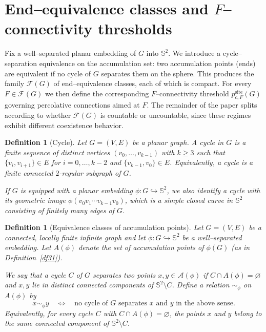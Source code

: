 \documentclass[11pt]{amsart}
\theoremstyle{plain}
\newtheorem{definition}[theorem]{Definition}
\numberwithin{equation}{section}
\numberwithin{figure}{section}
\begin{document}
\section{End--equivalence classes and $F$--connectivity thresholds}
\label{sec3}

Fix a well--separated planar embedding of $G$ into $\mathbb S^2$.
We introduce a cycle--separation equivalence on the accumulation set: two accumulation points (ends)
are equivalent if no cycle of $G$ separates them on the sphere.
This produces the family $\mathcal F(G)$ of end--equivalence classes, each of which is compact.
For every $F\in\mathcal F(G)$ we then define the corresponding $F$--connectivity threshold
$p^{\mathrm{site}}_{c,F}(G)$ governing percolative connections aimed at $F$.
The remainder of the paper splits according to whether $\mathcal F(G)$ is countable or uncountable,
since these regimes exhibit different coexistence behavior.

\begin{definition}[Cycle]
Let $G=(V,E)$ be a planar graph. A \emph{cycle} in $G$ is a finite sequence of distinct
vertices $(v_0,\ldots,v_{k-1})$ with $k\ge 3$ such that
$\{v_i,v_{i+1}\}\in E$ for $i=0,\ldots,k-2$ and $\{v_{k-1},v_0\}\in E$.
Equivalently, a cycle is a finite connected $2$-regular subgraph of $G$.

If $G$ is equipped with a planar embedding $\phi\colon G\hookrightarrow \mathbb S^2$,
we also identify a cycle with its geometric image
$\phi(v_0v_1\cdots v_{k-1}v_0)$, which is a simple closed curve in $\mathbb S^2$
consisting of finitely many edges of $G$.
\end{definition}



\begin{definition}[Equivalence classes of accumulation points]\label{df52}
Let $G=(V,E)$ be a connected, locally finite infinite graph and let
$\phi:G\hookrightarrow\mathbb S^2$ be a well--separated embedding.  
Let $A(\phi)$ denote the set of accumulation points of $\phi(G)$
(as in Definition~\ref{df31}).

We say that a cycle $C$ of $G$ \emph{separates} two points
$x,y\in \mathcal{A}(\phi)$ if $C\cap A(\phi)=\varnothing$ and $x,y$ lie in distinct
connected components of $\mathbb S^2\!\setminus C$.
Define a relation $\sim_\phi$ on $A(\phi)$ by
\[
x\sim_\phi y
\quad\Longleftrightarrow\quad
\text{no cycle of $G$ separates $x$ and $y$ in the above sense.}
\]
Equivalently, for every cycle $C$ with $C\cap A(\phi)=\varnothing$,
the points $x$ and $y$ belong to the same connected component of
$\mathbb S^2\!\setminus C$.
\end{definition}
\end{document}
